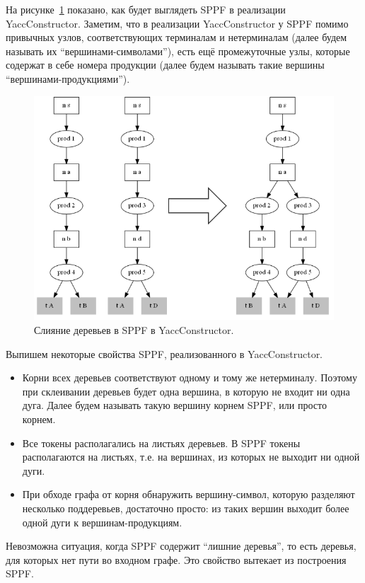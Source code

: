 На рисунке~\ref{sppf_yc} показано, как будет выглядеть SPPF в реализации YaccConstructor. Заметим, что в реализации YaccConstructor у SPPF помимо привычных узлов, соответствующих терминалам и нетерминалам (далее будем называть их ``вершинами-символами''), есть ещё промежуточные узлы, которые содержат в себе номера продукции (далее будем называть такие вершины ``вершинами-продукциями''). 

\begin{figure}[t]
    \centering
    \includegraphics[width=\linewidth]{Ivanov/Pictures/sppf_yc.png}
    \caption{Слияние деревьев в SPPF в YaccConstructor.}
    \label{sppf_yc}
\end{figure}

Выпишем некоторые свойства SPPF, реализованного в YaccConstructor. 
\begin{itemize}
\item Корни всех деревьев соответствуют одному и тому же нетерминалу. Поэтому при склеивании деревьев будет одна вершина, в которую не входит ни одна дуга. Далее будем называть такую вершину корнем SPPF, или просто корнем. 
\item Все токены располагались на листьях деревьев. В SPPF токены располагаются на листьях, т.е. на вершинах, из которых не выходит ни одной дуги.
\item При обходе графа от корня обнаружить вершину-символ, которую разделяют несколько поддеревьев, достаточно просто: из таких вершин выходит более одной дуги к вершинам-продукциям. 
\end{itemize}

Невозможна ситуация, когда SPPF содержит ``лишние деревья'', то есть деревья, для которых нет пути во входном графе. Это свойство вытекает из построения SPPF. 

